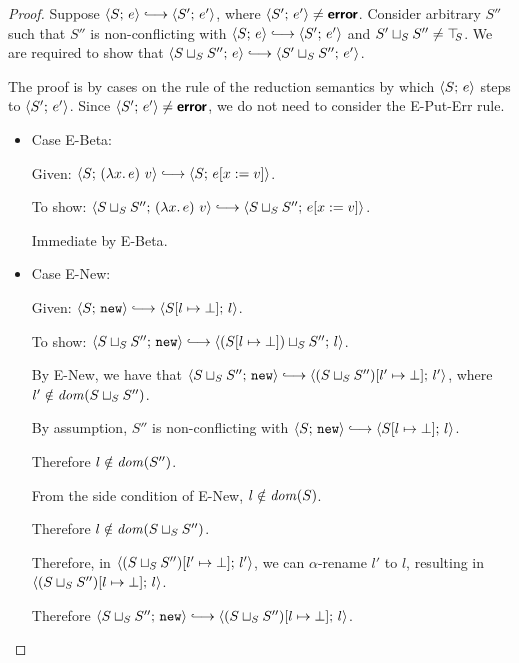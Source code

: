 \begin{proof}
  Suppose $\config{S}{e} \parstepsto \config{S'}{e'}$, where
  $\langle S';\, e' \rangle \neq \textbf{\textsf{error}}$.  Consider arbitrary $S''$ such that
  $S''$ is non-conflicting with $\config{S}{e} \parstepsto
  \config{S'}{e'}$ and $S' \sqcup_{S} S'' \neq \top\hspace{-0.85mm}_{S}$.  We are
  required to show that $\config{\lubstore{S}{S''}}{e} \parstepsto
  \config{\lubstore{S'}{S''}}{e'}$.

  The proof is by cases on the rule of the reduction semantics by
  which $\langle S;\, e \rangle$ steps to $\langle S';\, e' \rangle$.  Since
  $\langle S';\, e' \rangle \neq \textbf{\textsf{error}}$, we do not need to consider the {\sc
    E-Put-Err} rule.
  \begin{itemize}

    \item Case {\sc E-Beta}:

      Given: $\config{S}{\app{(\lam{x}{e})}{v}} \parstepsto
      \config{S}{\subst{e}{x}{v}}$.

      To show: $\config{\lubstore{S}{S''}}{\app{(\lam{x}{e})}{v}}
      \parstepsto \config{\lubstore{S}{S''}}{\subst{e}{x}{v}}$.

      Immediate by {\sc E-Beta}.

    \item Case {\sc E-New}:

      Given: $\config{S}{\NEW} \parstepsto
      \config{\extSRaw{S}{l}{\bot}}{l}$.

      To show: $\config{\lubstore{S}{S''}}{\NEW} \parstepsto
      \config{\lubstore{(\extSRaw{S}{l}{\bot})}{S''}}{l}$.

      By {\sc E-New}, we have that $\config{\lubstore{S}{S''}}{\NEW}
      \parstepsto \config{\extSRaw{(\lubstore{S}{S''})}{l'}{\bot}}{l'}$,
      where $l' \notin \mathit{dom}(S \sqcup_{S} S'')$.

      By assumption, $S''$ is non-conflicting with $\config{S}{\NEW}
      \parstepsto \config{\extSRaw{S}{l}{\bot}}{l}$.
 
      Therefore $l \notin \mathit{dom}(S'')$.

      From the side condition of {\sc E-New}, $l \notin \mathit{dom}(S)$.

      Therefore $l \notin \mathit{dom}(S \sqcup_{S} S'')$.

      Therefore, in
      $\langle (S \sqcup_{S} S'')[l' \mapsto \bot];\, l' \rangle$, we can
      $\alpha$-rename $l'$ to $l$, resulting in
      $\langle (S \sqcup_{S} S'')[l \mapsto \bot];\, l \rangle$.

      Therefore $\config{\lubstore{S}{S''}}{\NEW} \parstepsto
      \config{\extSRaw{(\lubstore{S}{S''})}{l}{\bot}}{l}$.


\end{itemize}
\end{proof}
